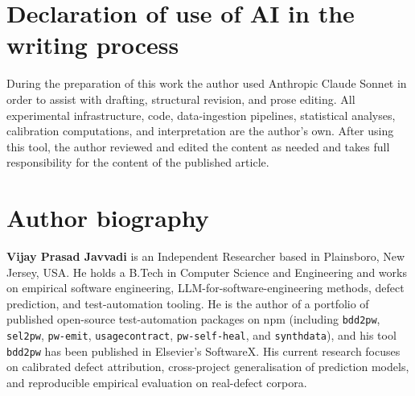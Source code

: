 \documentclass[preprint,12pt]{elsarticle}
\begin{document}
\section*{Declaration of use of AI in the writing process}
During the preparation of this work the author used Anthropic Claude
Sonnet in order to assist with drafting, structural revision, and
prose editing. All experimental infrastructure, code, data-ingestion
pipelines, statistical analyses, calibration computations, and
interpretation are the author's own. After using this tool, the author
reviewed and edited the content as needed and takes full
responsibility for the content of the published article.

\section*{Author biography}
\noindent\textbf{Vijay Prasad Javvadi} is an Independent Researcher
based in Plainsboro, New Jersey, USA. He holds a B.Tech in Computer
Science and Engineering and works on empirical software engineering,
LLM-for-software-engineering methods, defect prediction, and
test-automation tooling. He is the author of a portfolio of published
open-source test-automation packages on npm (including
\texttt{bdd2pw}, \texttt{sel2pw}, \texttt{pw-emit},
\texttt{usagecontract}, \texttt{pw-self-heal}, and \texttt{synthdata}),
and his tool \texttt{bdd2pw} has been published in Elsevier's
SoftwareX. His current research focuses on calibrated defect
attribution, cross-project generalisation of prediction models, and
reproducible empirical evaluation on real-defect corpora.



\end{document}
